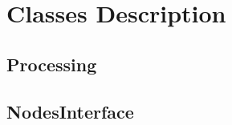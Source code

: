 \chapter{Classes Description}

\section{Processing}


\newpage
\section{NodesInterface}







\newpage

